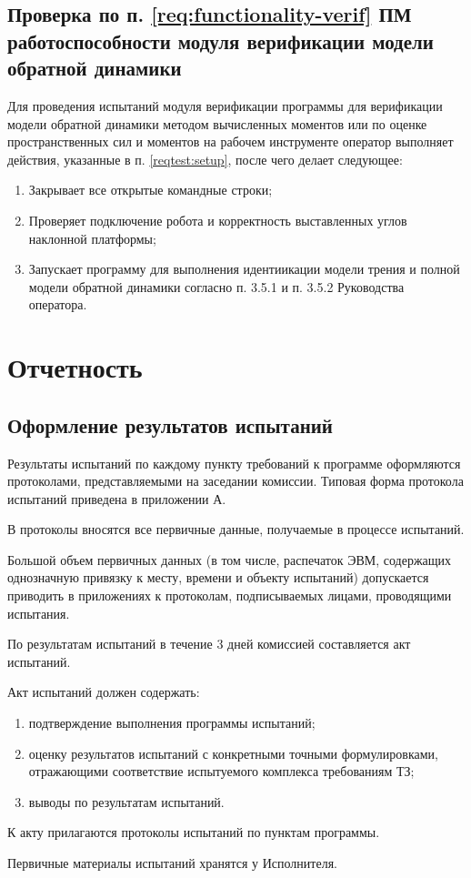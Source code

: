 \subsection{Проверка по п. \ref{req:functionality-verif} ПМ  работоспособности модуля верификации модели обратной динамики} \label{reqtest:functionality-verif}
Для проведения испытаний модуля верификации программы \productname для верификации модели обратной динамики методом вычисленных моментов
или по оценке пространственных сил и моментов на рабочем инструменте оператор выполняет действия, указанные в п. \ref{reqtest:setup}, после чего делает следующее:
\begin{enumerate}
  \item Закрывает все открытые командные строки;
  \item Проверяет подключение робота и корректность выставленных углов наклонной платформы;
  \item Запускает программу для выполнения идентиикации модели трения и полной модели обратной динамики согласно п. 3.5.1 и п. 3.5.2 Руководства оператора.
\end{enumerate}


\newpage
\section{Отчетность}

\subsection{Оформление результатов испытаний}
Результаты испытаний по каждому пункту требований к программе оформляются протоколами, представляемыми на заседании комиссии. Типовая форма протокола испытаний приведена в приложении А.

В протоколы вносятся все первичные данные, получаемые в процессе испытаний.

Большой объем первичных данных (в том числе, распечаток ЭВМ, содержащих однозначную привязку к месту, времени и объекту испытаний) допускается приводить в приложениях к протоколам, подписываемых лицами, проводящими испытания.

По результатам испытаний в течение 3 дней комиссией составляется акт испытаний.

Акт испытаний должен содержать:
\begin{enumerate}
    \item подтверждение выполнения программы испытаний;
    \item оценку результатов испытаний с конкретными точными формулировками, отражающими соответствие испытуемого комплекса требованиям ТЗ;
    \item выводы по результатам испытаний.
\end{enumerate}

К акту прилагаются протоколы испытаний по пунктам программы.

Первичные материалы испытаний хранятся у Исполнителя.
